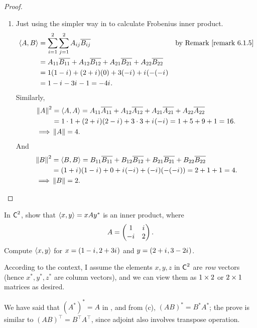 \begin{proof}
\begin{enumerate}
\item Just using the simpler way in  to calculate Frobenius inner product.
\begin{align*}
    \LG A, B \RG & = \sum_{i = 1}^2 \sum_{j = 1}^2 A_{ij} \conjugatet{B_{ij}} & \text{by \RMK{6.1.5}} \\
        & = A_{11} \conjugatet{B_{11}} + A_{12} \conjugatet{B_{12}} + A_{21} \conjugatet{B_{21}} + A_{22} \conjugatet{B_{22}} \\
        & = 1(1 - \iu) + (2 + \iu)(0) + 3(-\iu) + \iu(-(-\iu) \\
        & = 1 - \iu - 3\iu - 1 = -4\iu.
\end{align*}
Similarly,
\begin{align*}
    \left\lVert A\right\rVert^2 & = \left< A, A \right> = A_{11} \overline{A_{11}} + A_{12} \overline{A_{12}} + A_{21} \overline{A_{21}} + A_{22} \overline{A_{22}} \\
        & = 1 \cdot 1 + (2 + {i\mkern1mu})(2 - {i\mkern1mu}) + 3 \cdot 3 + {i\mkern1mu}(-{i\mkern1mu}) = 1 + 5 + 9 + 1 = 16. \\
    \implies & \left\lVert A\right\rVert = 4.
\end{align*}
And
\begin{align*}
    \left\lVert B\right\rVert^2 & = \left< B, B \right> = B_{11} \overline{B_{11}} + B_{12} \overline{B_{12}} + B_{21} \overline{B_{21}} + B_{22} \overline{B_{22}} \\
        & = (1 + {i\mkern1mu})(1 - {i\mkern1mu}) + 0 + {i\mkern1mu}(-{i\mkern1mu}) + (-{i\mkern1mu})(-(-{i\mkern1mu})) = 2 + 1 + 1 = 4. \\
    \implies & \left\lVert B\right\rVert = 2.
\end{align*}
\end{enumerate}
\end{proof}

\begin{exercise} \label{exercise 6.1.5}
In \(\textsf{C}^2\), show that \(\left< x, y \right> = x A y^*\) is an inner product, where
\[
    A = \begin{pmatrix} 1 & {i\mkern1mu} \\ -{i\mkern1mu} & 2 \end{pmatrix}.
\]
Compute \(\left< x, y \right>\) for \(x = (1 - {i\mkern1mu}, 2 + 3{i\mkern1mu})\) and \(y = (2 + {i\mkern1mu}, 3 - 2{i\mkern1mu})\).
\end{exercise}

\begin{note}
According to the context, I assume the elements \(x, y, z\) in \(\textsf{C}^2\) are \emph{row} vectors (hence \(x^*, y^*, z^*\) are column vectors), and we can view them as \(1 \times 2\) or \(2 \times 1\) matrices as desired.

We have said that \((A^*)^* = A\) in , and from (c), \((AB)^* = B^* A^*\); the prove is similar to \((AB)^\top = B^\top A^\top\), since adjoint also involves transpose operation.
\end{note}

